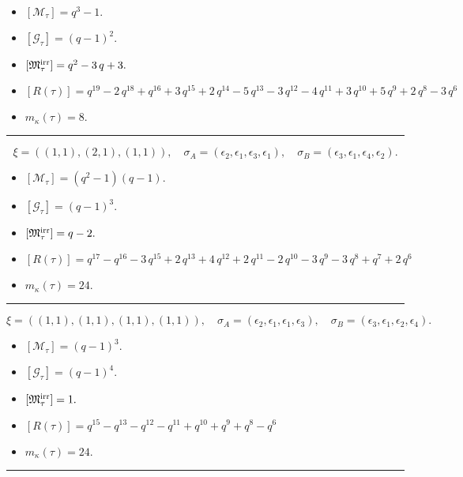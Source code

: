\documentclass[10pt,a4paper]{amsart}
\begin{document}
\begin{itemize}
 \item $[\mathcal{M}_{\tau}] = q^{3} - 1 .$

 \item $[\mathcal{G}_{\tau}] = {\left(q - 1\right)}^{2} .$

 \item $[{\frak M}_{\tau}^{\textrm{irr}}] = q^{2} - 3 \, q + 3 .$

 \item $[R(\tau)] = q^{19} - 2 \, q^{18} + q^{16} + 3 \, q^{15} + 2 \, q^{14} - 5 \, q^{13} - 3 \, q^{12} - 4 \, q^{11} + 3 \, q^{10} + 5 \, q^{9} + 2 \, q^{8} - 3 \, q^{6} $

 \item $m_{\kappa}(\tau) = 8 .$

 \end{itemize}
\noindent\rule{8cm}{0.4pt}

$$\xi = ({(1, 1)}, {(2, 1), (1, 1)}),\quad \sigma_A = ({{\epsilon_2}}, {{\epsilon_1, \epsilon_3}, {\epsilon_1}}),\quad \sigma_B = ({{\epsilon_3}}, {{\epsilon_1, \epsilon_4}, {\epsilon_2}}).$$

\begin{itemize}
 \item $[\mathcal{M}_{\tau}] = {\left(q^{2} - 1\right)} {\left(q - 1\right)} .$

 \item $[\mathcal{G}_{\tau}] = {\left(q - 1\right)}^{3} .$

 \item $[{\frak M}_{\tau}^{\textrm{irr}}] = q - 2 .$

 \item $[R(\tau)] = q^{17} - q^{16} - 3 \, q^{15} + 2 \, q^{13} + 4 \, q^{12} + 2 \, q^{11} - 2 \, q^{10} - 3 \, q^{9} - 3 \, q^{8} + q^{7} + 2 \, q^{6} $

 \item $m_{\kappa}(\tau) = 24 .$

 \end{itemize}
\noindent\rule{8cm}{0.4pt}

$$\xi = ({(1, 1)}, {(1, 1), (1, 1), (1, 1)}),\quad \sigma_A = ({{\epsilon_2}}, {{\epsilon_1}, {\epsilon_1}, {\epsilon_3}}),\quad \sigma_B = ({{\epsilon_3}}, {{\epsilon_1}, {\epsilon_2}, {\epsilon_4}}).$$

\begin{itemize}
 \item $[\mathcal{M}_{\tau}] = {\left(q - 1\right)}^{3} .$

 \item $[\mathcal{G}_{\tau}] = {\left(q - 1\right)}^{4} .$

 \item $[{\frak M}_{\tau}^{\textrm{irr}}] = 1 .$

 \item $[R(\tau)] = q^{15} - q^{13} - q^{12} - q^{11} + q^{10} + q^{9} + q^{8} - q^{6} $

 \item $m_{\kappa}(\tau) = 24 .$

 \end{itemize}
\noindent\rule{8cm}{0.4pt}
\end{document}

